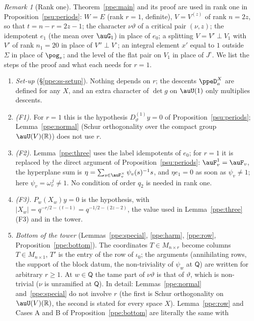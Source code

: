 \documentclass[10pt]{amsart}
\theoremstyle{definition}
\theoremstyle{remark}
\newtheorem{remark}[theorem]{Remark}
\newcommand{\R}{\mathbb R}
\begin{document}
\begin{remark}[Rank one]\label{ppe:rem-rankone}
Theorem~\ref{ppe:main} and its proof are used in rank one in Proposition~\ref{psu:periods}: $W=E$
(rank $r=1$, definite), $V=V^{(z)}$ of rank $n=2z$, so that $t=n-r=2z-1$; the character $\nu\vartheta$ of a
critical pair $(\nu,z)$; the idempotent $e_1$ (the mean over $\auG_1$) in place of $e_0$; a splitting
$V=V'\perp V_1$ with $V'$ of rank $n_1=20$ in place of $V''\perp V^\circ$; an integral element $x'$
equal to $1$ outside $\Sigma$ in place of $\pog_s$; and the level of the flat pair on $V_1$ in place of
$J^\circ$. We list the steps of the proof and what each needs for $r=1$.
\begin{enumerate}
\item[(1)] \emph{Set-up} (\S\ref{ppe:ss-setup}). Nothing depends on $r$; the descents $\ppeD^X_a$ are
defined for any $X$, and an extra character of $\det g$ on $\auU(1)$ only multiplies descents.
\item[(2)] \emph{(F1).} For $r=1$ this is the hypothesis $D^{(1)}_\vartheta y=0$ of
Proposition~\ref{psu:periods}; Lemma~\ref{ppe:normal} (Schur orthogonality over the compact group
$\auU(V)(\R)$) does not use $r$.
\item[(3)] \emph{(F2).} Lemma~\ref{ppe:three} uses the label idempotents of $e_0$; for $r=1$ it is
replaced by the direct argument of Proposition~\ref{psu:periods}: $\auF_v^1=\auF_v$, the hyperplane
sum is $\eta=\sum_{s\in\auF_v^\times}\psi_v(s)^{-1}s$, and $\eta e_1=0$ as soon as $\psi_v\ne1$; here
$\psi_v=\omega_v^{\,j}\ne1$. No condition of order $q_2$ is needed in rank one.
\item[(4)] \emph{(F3).} $P_w(X_w)y=0$ is the hypothesis, with $|X_w|=q^{-r/2-(t-1)}=q^{-1/2-(2z-2)}$,
the value used in Lemma~\ref{ppe:three}(F3) and in the tower.
\item[(5)] \emph{Bottom of the tower} (Lemmas~\ref{ppe:special}, \ref{ppe:harm}, \ref{ppe:row},
Proposition~\ref{ppe:bottom}). The coordinates $T\in M_{n\times r}$ become columns $T\in M_{n\times1}$,
$T'$ is the entry of the row of $\iota_0$; the arguments (annihilating rows, the support of the block
datum, the non-triviality of $\psi_w$ at $\mathsf Q$) are written for arbitrary $r\ge1$. At
$w\in\mathsf Q$ the tame part of $\nu\vartheta$ is that of $\vartheta$, which is non-trivial ($\nu$ is
unramified at $\mathsf Q$). In detail: Lemmas~\ref{ppe:normal} and~\ref{ppe:special} do not involve
$r$ (the first is Schur orthogonality on $\auU(V)(\R)$, the second is stated for every space $X$).
Lemma~\ref{ppe:row} and Cases A and B of Proposition~\ref{ppe:bottom} are literally the same with

\end{enumerate}
\end{remark}
\end{document}

